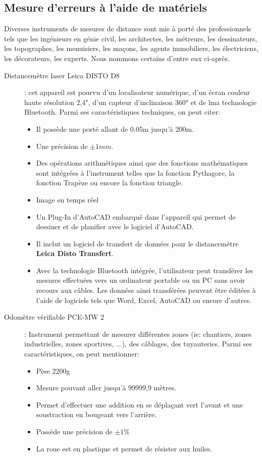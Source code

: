 \documentclass[a4paper, 12pt]{book}
\begin{document}
\subsection{Mesure d'erreurs à l'aide de matériels}
Diverses instruments de mesures de distance sont mis à porté des professionnels tels que les ingénieurs en génie civil, les architectes, les métreurs, les dessinateurs, les topographes, les menuisiers, les maçons, les agents immobiliers, les électriciens, les décorateurs, les experts. Nous nommons certains d'entre eux ci-après.
\begin{description}
	\item[Distancemètre laser Leica DISTO D8]: cet appareil est pourvu d'un localisateur numérique, d'un écran couleur haute résolution 2,4", d'un capteur d'inclinaison 360° et de lma technologie Bluetooth. Parmi ses caractéristiques techniques, on peut citer:
	\begin{itemize}
		\item Il possède une porté allant de 0.05m jusqu'à 200m.
		\item Une précision de $\pm 1mm$.
		\item Des opérations arithmétiques ainsi que des fonctions mathématiques sont intégrées à l'instrument telles que la fonction Pythagore, la fonction Trapèze ou encore la fonction triangle.
		\item Image en temps réel 
		\item Un Plug-In d'AutoCAD embarqué dans l'appareil qui permet de dessiner et de planifier avec le logiciel d'AutoCAD.
		\item Il inclut un logiciel de transfert de données pour le distancemètre  \textbf{Leica Disto Transfert}.
		\item Avec la technologie Bluetooth intégrée, l'utilisateur peut transférer les mesures effectuées vers un ordinateur portable ou un PC sans avoir recours aux câbles. Les données ainsi transférées peuvent être éditées à l'aide de logiciels tels que Word, Excel, AutoCAD ou encore d'autres.  
	\end{itemize}
\end{description}

\begin{description}
	\item[Odomètre vérifiable PCE-MW 2]: Instrument permettant de mesurer différentes zones (ie: chantiers, zones industrielles, zones sportives, ...), des câblages, des tuyauteries. Parmi ses caractéristiques, on peut mentionner:
	\begin{itemize}
		\item Pèse 2200g
		\item Mesure pouvant aller jusqu'à 99999,9 mètres.
		\item Permet d'effectuer une addition en se déplaçant vert l'avant et une soustraction en bougeant vers l'arrière.
		\item Possède une précision de $\pm 1\%$
		\item La roue est en plastique et permet de résister aux huiles.
	\end{itemize}	
\end{description}
\end{document}
